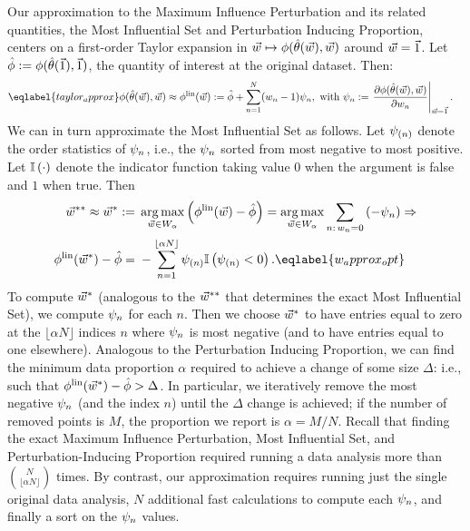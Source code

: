 Our approximation to the Maximum Influence Perturbation and its related
quantities, the Most Influential Set and Perturbation Inducing Proportion,
centers on a first-order Taylor expansion in $\vec{w} \mapsto
\phi(\hat{\theta}(\vec{w}), \vec{w})$ around $\vec{w} = \vec{1}$.  Let $\hat{\phi} :=
\phi(\hat{\theta}(\vec{1}), \vec{1})$, the quantity of interest at the
original dataset.  Then:
%
\begin{align} \eqlabel{taylor_approx}
	\thetafun(\thetahat(\w), \w)
		&\approx \thetafunlin(\w)
		:= \thetafunhat +
            \sumn (w_n - 1) \infl_n,
    \textrm{ with } \infl_n :=
        \fracat{\partial \thetafun(\thetahat(\w), \w)}
               {\partial w_n}{\w = \onevec}.
\end{align}
%
We can in turn approximate the Most Influential Set as follows.  Let
$\psi_{(n)}$ denote the order statistics of $\psi_n$, i.e., the $\psi_n$
sorted from most negative to most positive.  Let $\mathbb{I}\left(\cdot\right)$ denote the
indicator function taking value $0$ when the argument is false and $1$ when
true.  Then
%
\begin{align}
	\w^{**}  \approx
    \w^*
			:={}& \argmax_{\w \in W_\alpha}
   				 \left( \thetafunlin(\w) - \thetafunhat \right)
			= \argmax_{\w \in W_\alpha} \sum_{n: \, w_n = 0} \left(- \infl_n\right)
            \Rightarrow \nonumber
\\
\thetafunlin(\w^*) - \thetafunhat
    ={}& -\sum_{n=1}^{\lfloor \alpha N \rfloor} \infl_{(n)}
        \ind{\infl_{(n)} < 0}. \eqlabel{w_approx_opt}
\end{align}
%
To compute $\vec{w}^*$ (analogous to the $\vec{w}^{**}$ that determines the exact Most
Influential Set), we compute $\psi_n$ for each $n$. Then we choose $\vec{w}^*$ to
have entries equal to zero at the $\lfloor \alpha N \rfloor$ indices $n$ where
$\psi_n$ is most negative (and to have entries equal to one elsewhere).
Analogous to the Perturbation Inducing Proportion, we can find the minimum data
proportion $\alpha$ required to achieve a change of some size $\Delta$: i.e.,
such that $\phi^{\mathrm{lin}}(\vec{w}^*) - \hat{\phi} > \Delta$. In particular, we
iteratively remove the most negative $\psi_n$ (and the index $n$) until the
$\Delta$ change is achieved; if the number of removed points is $M$, the
proportion we report is $\alpha = M/N$. Recall that finding the exact Maximum
Influence Perturbation, Most Influential Set, and Perturbation-Inducing
Proportion required running a data analysis more than $\binom{N}{\lfloor \alpha
N \rfloor}$ times. By contrast, our approximation requires running just the
single original data analysis, $N$ additional fast calculations to compute each
$\psi_n$, and finally a sort on the $\psi_n$ values.

